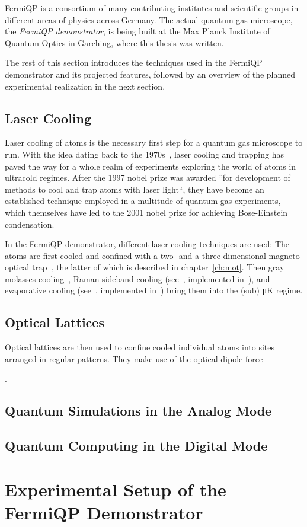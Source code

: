 FermiQP is a consortium of many contributing institutes and scientific groups in different areas of physics across Germany. The actual quantum gas microscope, the \textit{FermiQP demonstrator}, is being built at the Max Planck Institute of Quantum Optics in Garching, where this thesis was written.

The rest of this section introduces the techniques used in the FermiQP demonstrator and its projected features, followed by an overview of the planned experimental realization in the next section.

\subsection*{Laser Cooling}
Laser cooling of atoms is the necessary first step for a quantum gas microscope to run. With the idea dating back to the 1970s~\cite{hansch_cooling_1975}, laser cooling and trapping has paved the way for a whole realm of experiments exploring the world of atoms in ultracold regimes. After the 1997 nobel prize was awarded ''for development of methods to cool and trap atoms with laser light``, they have become an established technique employed in a multitude of quantum gas experiments, which themselves have led to the 2001 nobel prize for achieving Bose-Einstein condensation.

In the FermiQP demonstrator, different laser cooling techniques are used: The atoms are first cooled and confined with a two- and a three-dimensional magneto-optical trap~\cite{foot_atomic_2005}, the latter of which is described in chapter~\ref{ch:mot}. Then gray molasses cooling~\cite{weidemuller_novel_1994}, Raman sideband cooling (see~\cite*{hilker_spin-resolved_2017}, implemented in~\cite{krumm_notitle_2022}), and evaporative cooling (see~\cite{foot_atomic_2005}, implemented in~\cite{sun_construction_2022}) bring them into the (sub) \si[]{\micro\kelvin} regime.

\subsection*{Optical Lattices}
Optical lattices are then used to confine cooled individual atoms into sites arranged in regular patterns. They make use of the optical dipole force

\cite{bloch_many-body_2008, bloch_quantum_2012}.

\subsection*{Quantum Simulations in the Analog Mode}

\subsection*{Quantum Computing in the Digital Mode}



\section{Experimental Setup of the FermiQP Demonstrator}